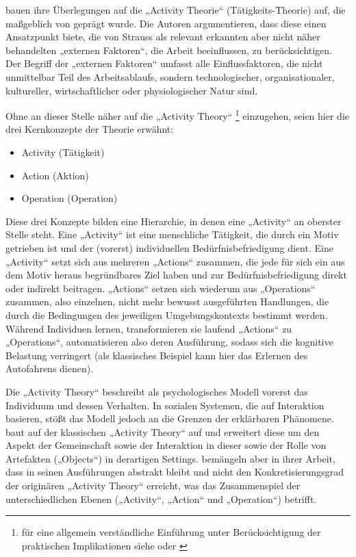 \citet{Fjuk97} bauen ihre Überlegungen auf die „Activity Theorie“ (Tätigkeits-Theorie) auf, die maßgeblich von \citet{Leontev72} geprägt wurde. Die Autoren argumentieren, dass diese einen Ansatzpunkt biete, die von Strauss als relevant erkannten aber nicht näher behandelten „externen Faktoren“, die Arbeit beeinflussen, zu berücksichtigen. Der Begriff der „externen Faktoren“ umfasst alle Einflussfaktoren, die nicht unmittelbar Teil des Arbeitsablaufs, sondern technologischer, organisationaler, kultureller, wirtschaftlicher oder physiologischer Natur sind. 

Ohne an dieser Stelle näher auf die „Activity Theory“ \footnote{für eine allgemein verständliche Einführung unter Berücksichtigung der praktischen Implikationen siehe \citet{Dahme97} oder \citet{Nardi06}} einzugehen, seien hier die drei Kernkonzepte der Theorie erwähnt:
\begin{itemize}
	\item Activity (Tätigkeit)
	\item Action (Aktion)
	\item Operation (Operation)
\end{itemize}

Diese drei Konzepte bilden eine Hierarchie, in denen eine „Activity“ an oberster Stelle steht. Eine „Activity“ ist eine menschliche Tätigkeit, die durch ein Motiv getrieben ist und der (vorerst) individuellen Bedürfnisbefriedigung dient. Eine „Activity“ setzt sich aus mehreren „Actions“ zusammen, die jede für sich ein aus dem Motiv heraus begründbares Ziel haben und zur Bedürfnisbefriedigung direkt oder indirekt beitragen. „Actions“ setzen sich wiederum aus „Operations“ zusammen, also einzelnen, nicht mehr bewusst ausgeführten Handlungen, die durch die Bedingungen des jeweiligen Umgebungskontexts bestimmt werden. Während Individuen lernen, transformieren sie laufend „Actions“ zu „Operations“, automatisieren also deren Ausführung, sodass sich die kognitive Belastung verringert (als klassisches Beispiel kann hier das Erlernen des Autofahrens dienen).

Die „Activity Theory“ beschreibt als psychologisches Modell vorerst das Individuum und dessen Verhalten. In sozialen Systemen, die auf Interaktion basieren, stößt das Modell jedoch an die Grenzen der erklärbaren Phänomene. \citet{Engestrom87} baut auf der klassischen „Activity Theory“ auf und erweitert diese um den Aspekt der Gemeinschaft sowie der Interaktion in dieser sowie der Rolle von Artefakten („Objects“) in derartigen Settings. \citet{Fjuk97} bemängeln aber in ihrer Arbeit, dass \citeauthor{Engestrom87} in seinen Ausführungen abstrakt bleibt und nicht den Konkretisierungsgrad der originären „Activity Theory“ erreicht, was das Zusammenspiel der unterschiedlichen Ebenen („Activity“, „Action“ und „Operation“) betrifft.

